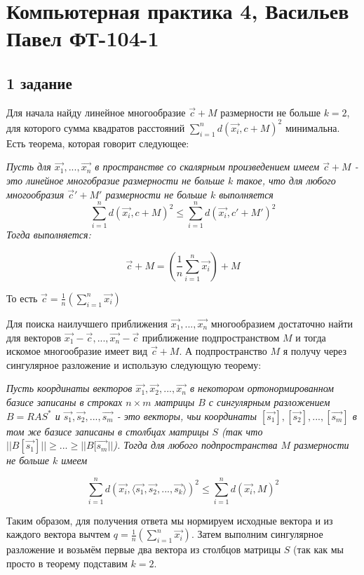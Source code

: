 \documentclass[a4paper]{article}
\author{Васильев Павел}
\begin{document}
\section*{Компьютерная практика 4, Васильев Павел ФТ-104-1}

\subsection*{1 задание}

Для начала найду линейное многообразие $\vec{c} + M$ размерности не больше $k = 2$, для которого сумма квадратов расстояний $\sum_{i=1}^n d(\vec{x_i}, c + M)^2$ минимальна. Есть теорема, которая говорит следующее:

\textit{Пусть для $\vec{x_1}, ..., \vec{x_n}$ в пространстве со скалярным произведением имеем $\vec{c} + M$ - это линейное многобразие размерности не больше $k$ такое, что для любого многообразия $\vec{c}' + M'$ размерности не больше $k$ выполняется
\[
\sum_{i=1}^n d(\vec{x_i}, c + M)^2 \leq \sum_{i=1}^n d(\vec{x_i}, c' + M')^2
\] Тогда выполняется:}

\[
\vec{c} + M = \left( \frac{1}{n} \sum_{i=1}^n \vec{x_i} \right) + M
\]

То есть $\vec{c} = \frac{1}{n} \left( \sum_{i=1}^n \vec{x_i} \right)$

Для поиска наилучшего приближения $\vec{x_1}, ..., \vec{x_n}$ многообразием достаточно найти для векторов $\vec{x_1} - \vec{c}, ..., \vec{x_n} - \vec{c}$ приближение подпространством $M$ и тогда искомое многообразие имеет вид $\vec{c} + M$. А подпространство $M$ я получу через сингулярное разложение и использую следующую теорему:

\textit{
Пусть координаты векторов $\vec{x_1}, \vec{x_2}, ..., \vec{x_n}$ в некотором ортонормированном базисе записаны в строках $n \times m$ матрицы $B$ с сингулярным разложением $B = RAS^*$ и $\vec{s_1}, \vec{s_2}, ..., \vec{s_m}$ - это векторы, чьи координаты $[\vec{s_1}], [\vec{s_2}], ...,[\vec{s_m}]$ в том же базисе записаны в столбцах матрицы $S$ (так что $||B[\vec{s_1}]|| \geq ... \geq ||B[\vec{s_m}||$). Тогда для любого подпространства $M$ размерности не больше $k$ имеем}

\[\sum_{i=1}^n d(\vec{x_i}, \langle \vec{s_1}, \vec{s_2}, ..., \vec{s_k} \rangle ) ^2 \leq \sum_{i=1}^n d( \vec{x_i}, M)^2\]


Таким образом, для получения ответа мы нормируем исходные вектора и из каждого вектора вычтем $q = \frac{1}{n} \left( \sum_{i=1}^n \vec{x_i} \right)$. Затем выполним сингулярное разложение и возьмём первые два вектора из столбцов матрицы $S$ (так как мы просто в теорему подставим $k=2$.
\end{document}
